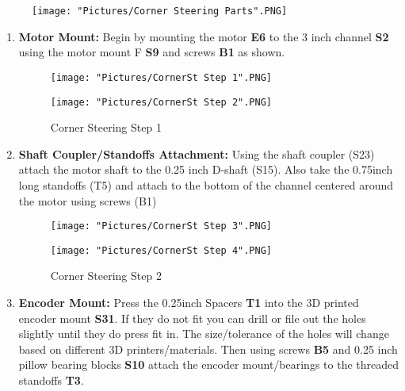\documentclass[12pt]{article}
\begin{document}
\begin{figure}[H]
	\centering
	\texttt{[image: "Pictures/Corner Steering Parts".PNG]}
\end{figure}


\begin{enumerate}
\item \textbf{Motor Mount:} Begin by mounting the motor \textbf{E6} to the 3 inch channel \textbf{S2} using the motor mount F \textbf{S9} and screws \textbf{B1} as shown. 

\begin{figure}[H]
  \centering
  \begin{minipage}[b]{0.45\textwidth}
    \texttt{[image: "Pictures/CornerSt Step 1".PNG]}
  \end{minipage}
  \hfill
  \begin{minipage}[b]{0.45\textwidth}
    \texttt{[image: "Pictures/CornerSt Step 2".PNG]}
  \end{minipage}
  \caption{Corner Steering Step 1}
\end{figure}

\item \textbf{Shaft Coupler/Standoffs Attachment:} Using the shaft coupler (S23) attach the motor shaft to the 0.25 inch D-shaft (S15). Also take the 0.75inch long standoffs (T5) and attach to the bottom of the channel centered around the motor using screws (B1) 

\begin{figure}[H]
  \centering
  \begin{minipage}[b]{0.45\textwidth}
    \texttt{[image: "Pictures/CornerSt Step 3".PNG]}
  \end{minipage}
  \hfill
  \begin{minipage}[b]{0.45\textwidth}
    \texttt{[image: "Pictures/CornerSt Step 4".PNG]}
  \end{minipage}
  \caption{Corner Steering Step 2}
\end{figure}

\item \textbf{Encoder Mount:} Press the 0.25inch Spacers \textbf{T1} into the 3D printed encoder mount \textbf{S31}. If they do not fit you can drill or file out the holes slightly until they do press fit in. The size/tolerance of the holes will change based on different 3D printers/materials. Then using screws \textbf{B5} and 0.25 inch pillow bearing blocks \textbf{S10} attach the encoder mount/bearings to the threaded standoffs \textbf{T3}.


\end{enumerate}
\end{document}
